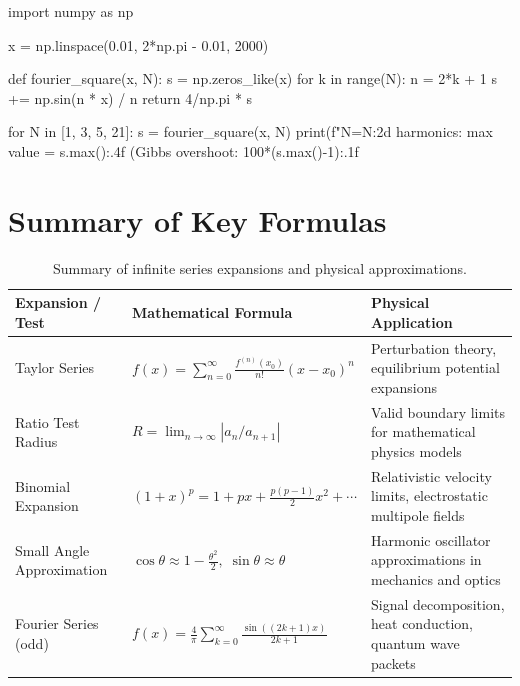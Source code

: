 \begin{pythonbox}
import numpy as np

x = np.linspace(0.01, 2*np.pi - 0.01, 2000)

def fourier_square(x, N):
    s = np.zeros_like(x)
    for k in range(N):
        n = 2*k + 1
        s += np.sin(n * x) / n
    return 4/np.pi * s

for N in [1, 3, 5, 21]:
    s = fourier_square(x, N)
    print(f"N={N:2d} harmonics: max value = {s.max():.4f}  (Gibbs overshoot: {100*(s.max()-1):.1f}%
\end{pythonbox}

\section{Summary of Key Formulas}
\begin{table}[H]
\centering
\small
\begin{tabularx}{\textwidth}{llX}
\toprule
\textbf{Expansion / Test} & \textbf{Mathematical Formula} & \textbf{Physical Application} \\
\midrule
Taylor Series & $f(x) = \sum_{n=0}^\infty \frac{f^{(n)}(x_0)}{n!}(x - x_0)^n$ & Perturbation theory, equilibrium potential expansions \\
Ratio Test Radius & $R = \lim_{n \to \infty} |a_n / a_{n+1}|$ & Valid boundary limits for mathematical physics models \\
Binomial Expansion & $(1+x)^p = 1 + px + \frac{p(p-1)}{2}x^2 + \cdots$ & Relativistic velocity limits, electrostatic multipole fields \\
Small Angle Approximation & $\cos\theta \approx 1 - \frac{\theta^2}{2}, \; \sin\theta \approx \theta$ & Harmonic oscillator approximations in mechanics and optics \\
Fourier Series (odd) & $f(x) = \frac{4}{\pi}\sum_{k=0}^{\infty}\frac{\sin((2k+1)x)}{2k+1}$ & Signal decomposition, heat conduction, quantum wave packets \\
\bottomrule
\end{tabularx}
\caption{Summary of infinite series expansions and physical approximations.}
\label{tab:ch03_summary}
\end{table}

